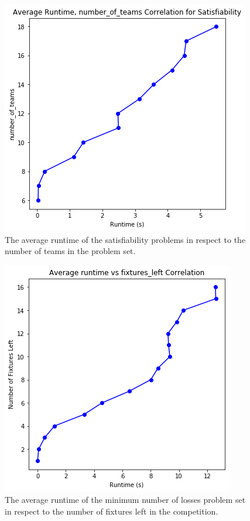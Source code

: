 \documentclass{article}
\begin{document}
	\begin{figure}
		\centering
		\includegraphics[width=0.7\linewidth]{graphs/LR/rt-num_teams-LR}
		\caption{The average runtime of the satisfiability problems in respect to the number of teams in the problem set.}
		\label{fig:rt-numteam-lr}
	\end{figure}
	\begin{figure}
		\centering
		\includegraphics[width=0.7\linewidth]{graphs/LR/mnl-fix_left-LR}
		\caption{The average runtime of the minimum number of losses problem set in respect to the number of fixtures left in the competition.}
		\label{fig:mnl-fix_left-lr}
	\end{figure}
\end{document}
